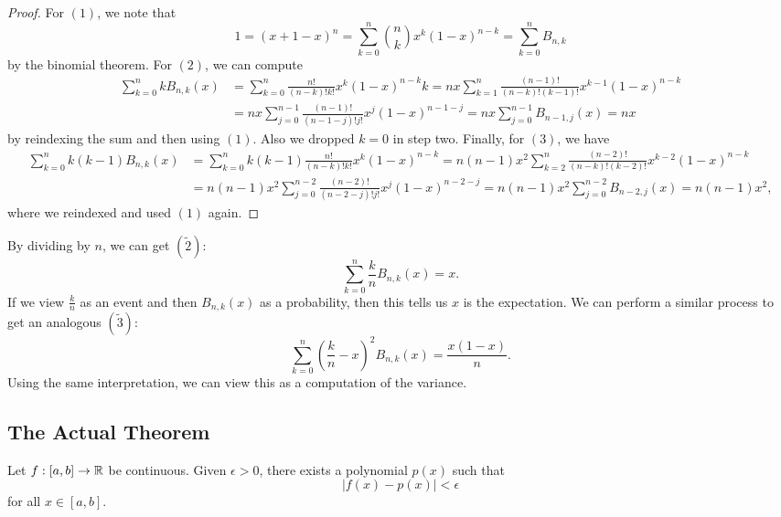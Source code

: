 \begin{proof}
  For $(1)$, we note that
  \[
    1 = (x + 1 - x)^n = \sum_{k = 0}^n \binom{n}{k}
    x^k (1 - x)^{n - k} = \sum_{k = 0}^n B_{n, k}
  \]
  by the binomial theorem. For $(2)$, we can compute
  \begin{align*}
    \sum_{k = 0}^n k B_{n, k}(x)
    &= \sum_{k = 0}^n \frac{n!}{(n - k)!k!} x^k (1 - x)^{n - k} k
    = nx \sum_{k = 1}^n \frac{(n - 1)!}{(n - k)!(k - 1)!}
    x^{k - 1}(1 - x)^{n - k} \\
    &= nx \sum_{j = 0}^{n - 1} \frac{(n - 1)!}{(n - 1 - j)!j!} x^j (1 - x)^{n - 1 - j}
    = nx\sum_{j = 0}^{n - 1} B_{n - 1, j}(x)
    = nx
  \end{align*}
  by reindexing the sum and then using $(1)$.
  Also we dropped $k = 0$ in step two.
  Finally, for $(3)$, we have
  \begin{align*}
    \sum_{k = 0}^n k(k - 1)B_{n, k}(x)
    &= \sum_{k = 0}^n k(k - 1) \frac{n!}{(n - k)!k!} x^k (1 - x)^{n - k}
    = n(n - 1)x^2 \sum_{k = 2}^n \frac{(n - 2)!}{(n - k)!(k - 2)!} x^{k - 2} (1 - x)^{n - k} \\
    &= n(n - 1)x^2 \sum_{j = 0}^{n - 2} \frac{(n - 2)!}{(n - 2 - j)!j!}x^j (1 - x)^{n - 2 - j}
    = n(n - 1)x^2 \sum_{j = 0}^{n - 2} B_{n - 2, j}(x)
    = n(n - 1)x^2,
  \end{align*}
  where we reindexed and used $(1)$ again.
\end{proof}

\begin{remark}
  By dividing by $n$, we can get $(\widetilde{2})$:
  \[
    \sum_{k = 0}^n \frac{k}{n} B_{n, k}(x) = x
  .\]
  If we view $\frac{k}{n}$ as an event and
  then $B_{n, k}(x)$ as a probability, then this tells us
  $x$ is the expectation. We can perform a similar
  process to get an analogous $(\widetilde{3})$:
  \[
    \sum_{k = 0}^n \left(\frac{k}{n} - x\right)^2 B_{n, k}(x) = \frac{x(1 - x)}{n}
  .\]
  Using the same interpretation, we can view this
  as a computation of the variance.
\end{remark}

\subsection{The Actual Theorem}

\begin{theorem}
  Let $f : [a, b] \to \mathbb{R}$ be continuous. Given
  $\epsilon > 0$, there exists a polynomial $p(x)$ such
  that
  \[
    |f(x) - p(x)| < \epsilon
  \]
  for all $x \in [a, b]$.
\end{theorem}

